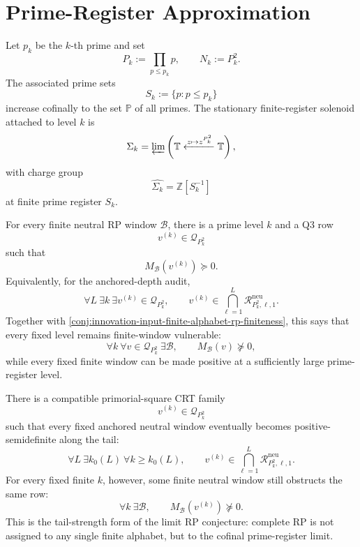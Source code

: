 \section{Prime-Register Approximation}
\label{sec:innovation-input-prime-register-approximation}

\begin{definition}
\label{def:innovation-input-cofinal-square-prime-register-tower}
Let $p_k$ be the $k$-th prime and set
$$
P_k:=\prod_{p\le p_k}p,
\qquad
N_k:=P_k^2.
$$
The associated prime sets
$$
S_k:=\{p:p\le p_k\}
$$
increase cofinally to the set $\mathbb P$ of all primes. The stationary
finite-register solenoid attached to level $k$ is
$$
\Sigma_k
=
\varprojlim
\left(
\mathbb T
\xleftarrow{z\mapsto z^{P_k^2}}
\mathbb T
\right),
$$
with charge group
$$
\widehat{\Sigma_k}=\mathbb Z[S_k^{-1}]
$$
at finite prime register $S_k$.
\end{definition}

\begin{conjecture}
\label{conj:innovation-input-prime-register-rp-approximation}
For every finite neutral RP window $\mathcal B$, there is a prime level
$k$ and a Q3 row
$$
v^{(k)}\in\mathcal Q_{P_k^2}
$$
such that
$$
M_{\mathcal B}(v^{(k)})\succeq0.
$$
Equivalently, for the anchored-depth audit,
$$
\forall L\ \exists k\ \exists v^{(k)}\in\mathcal Q_{P_k^2},
\qquad
v^{(k)}
\in
\bigcap_{\ell=1}^{L}\mathcal R_{P_k^2,\ell,1}^{\mathrm{neu}}.
$$
Together with
\autoref{conj:innovation-input-finite-alphabet-rp-finiteness}, this says
that every fixed level remains finite-window vulnerable:
$$
\forall k\ \forall v\in\mathcal Q_{P_k^2}\ \exists\mathcal B,
\qquad
M_{\mathcal B}(v)\not\succeq0,
$$
while every fixed finite window can be made positive at a sufficiently
large prime-register level.
\end{conjecture}


\begin{conjecture}
\label{conj:innovation-input-cofinal-tail-rp-approximation}
There is a compatible primorial-square CRT family
$$
v^{(k)}\in\mathcal Q_{P_k^2}
$$
such that every fixed anchored neutral window eventually becomes
positive-semidefinite along the tail:
$$
\forall L\ \exists k_0(L)\ \forall k\ge k_0(L),
\qquad
v^{(k)}
\in
\bigcap_{\ell=1}^{L}\mathcal R_{P_k^2,\ell,1}^{\mathrm{neu}}.
$$
For every fixed finite $k$, however, some finite neutral window still
obstructs the same row:
$$
\forall k\ \exists\mathcal B,
\qquad
M_{\mathcal B}(v^{(k)})\not\succeq0.
$$
This is the tail-strength form of the limit RP conjecture: complete RP is
not assigned to any single finite alphabet, but to the cofinal
prime-register limit.
\end{conjecture}

